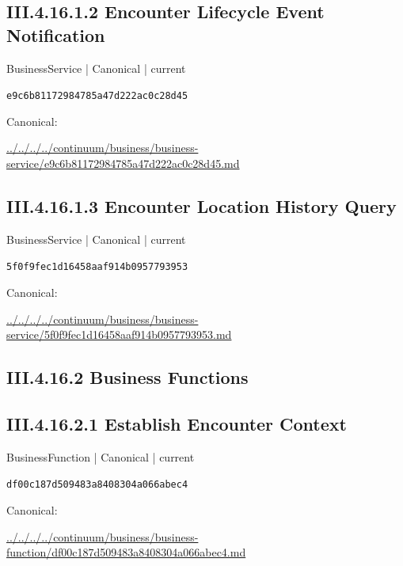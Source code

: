 \documentclass[10pt,a4paper]{article}
\begin{document}
\subsection*{III.4.16.1.2 Encounter Lifecycle Event Notification}
{\small BusinessService | Canonical | current}\par
\texttt{e9c6b81172984785a47d222ac0c28d45}\par
Canonical: \par
{\footnotesize\url{../../../../continuum/business/business-service/e9c6b81172984785a47d222ac0c28d45.md}}\par
\subsection*{III.4.16.1.3 Encounter Location History Query}
{\small BusinessService | Canonical | current}\par
\texttt{5f0f9fec1d16458aaf914b0957793953}\par
Canonical: \par
{\footnotesize\url{../../../../continuum/business/business-service/5f0f9fec1d16458aaf914b0957793953.md}}\par
\subsection*{III.4.16.2 Business Functions}
\subsection*{III.4.16.2.1 Establish Encounter Context}
{\small BusinessFunction | Canonical | current}\par
\texttt{df00c187d509483a8408304a066abec4}\par
Canonical: \par
{\footnotesize\url{../../../../continuum/business/business-function/df00c187d509483a8408304a066abec4.md}}\par
\end{document}
